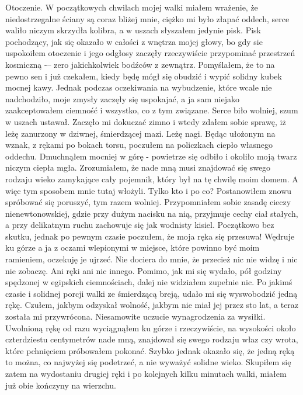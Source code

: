 Otoczenie. W początkowych chwilach mojej walki miałem wrażenie, że niedostrzegalne ściany są coraz bliżej mnie, ciężko mi było złapać oddech, serce waliło niczym skrzydła kolibra, a w uszach słyszałem jedynie pisk. Pisk pochodzący, jak się okazało w całości z wnętrza mojej głowy, bo gdy sie uspokoiłem otoczenie i jego odgłosy zaczęły rzeczywiście przypominać przestrzeń kosmiczną -– zero jakichkolwiek bodźców z zewnątrz. Pomyślałem, że to na pewno sen i już czekałem, kiedy będę mógł się obudzić i wypić solidny kubek mocnej kawy. Jednak podczas oczekiwania na wybudzenie, które wcale nie nadchodziło, moje zmysły zaczęły się uspokajać, a ja sam niejako zaakceptowałem ciemność i wszystko, co z tym związane. Serce biło wolniej, szum w uszach ustawał. Zaczęło mi dokuczać zimno i wtedy zdałem sobie sprawę, iż leżę zanurzony w dziwnej, śmierdzącej mazi. Leżę nagi. Będąc ułożonym na wznak, z rękami po bokach torsu, poczułem na policzkach ciepło własnego oddechu. Dmuchnąłem mocniej w górę - powietrze się odbiło i okoliło moją twarz niczym ciepła mgła. Zrozumiałem, że nade mną musi znajdować się swego rodzaju wieko zamykające cały pojemnik, który był na tę chwilę moim domem. A więc tym sposobem mnie tutaj włożyli. Tylko kto i po co? 
Postanowiłem znowu spróbować się poruszyć, tym razem wolniej. Przypomniałem sobie zasadę cieczy nienewtonowskiej, gdzie przy dużym nacisku na nią, przyjmuje cechy ciał stałych, a przy delikatnym ruchu zachowuje się jak wodnisty kisiel. Początkowo bez skutku, jednak po pewnym czasie poczułem, że moja ręka się przesuwa! Wędruje ku górze a ja z oczami wlepionymi w miejsce, które powinno być moim ramieniem, oczekuję je ujrzeć. Nie dociera do mnie, że przecież nic nie widzę i nic nie zobaczę. Ani ręki ani nic innego. Pomimo, jak mi się wydało, pół godziny spędzonej w egipskich ciemnościach, dalej nie widziałem zupełnie nic. Po jakimś czasie i solidnej porcji walki ze śmierdzącą breją, udało mi się wyswobodzić jedną rękę. Czułem, jakbym odzyskał wolność, jakbym nie miał jej przez sto lat, a teraz została mi przywrócona. Niesamowite uczucie wynagrodzenia za wysiłki. Uwolnioną rękę od razu wyciągnąłem ku górze i rzeczywiście, na wysokości około czterdziestu centymetrów nade mną, znajdował się swego rodzaju właz czy wrota, które pchnięciem próbowałem pokonać. Szybko jednak okazało się, że jedną ręką to można, co najwyżej się podetrzeć, a nie wyważyć solidne wieko. Skupiłem się zatem na wydostaniu drugiej ręki i po kolejnych kilku minutach walki, miałem już obie kończyny na wierzchu. 

